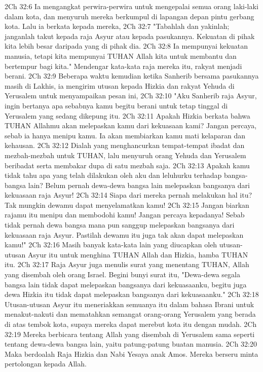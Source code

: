 2Ch 32:6  Ia mengangkat perwira-perwira untuk mengepalai semua orang laki-laki dalam kota, dan menyuruh mereka berkumpul di lapangan depan pintu gerbang kota. Lalu ia berkata kepada mereka,
2Ch 32:7  "Tabahlah dan yakinlah; janganlah takut kepada raja Asyur atau kepada pasukannya. Kekuatan di pihak kita lebih besar daripada yang di pihak dia.
2Ch 32:8  Ia mempunyai kekuatan manusia, tetapi kita mempunyai TUHAN Allah kita untuk membantu dan bertempur bagi kita." Mendengar kata-kata raja mereka itu, rakyat menjadi berani.
2Ch 32:9  Beberapa waktu kemudian ketika Sanherib bersama pasukannya masih di Lakhis, ia mengirim utusan kepada Hizkia dan rakyat Yehuda di Yerusalem untuk menyampaikan pesan ini,
2Ch 32:10  "Aku Sanherib raja Asyur, ingin bertanya apa sebabnya kamu begitu berani untuk tetap tinggal di Yerusalem yang sedang dikepung itu.
2Ch 32:11  Apakah Hizkia berkata bahwa TUHAN Allahmu akan melepaskan kamu dari kekuasaan kami? Jangan percaya, sebab ia hanya menipu kamu. Ia akan membiarkan kamu mati kelaparan dan kehausan.
2Ch 32:12  Dialah yang menghancurkan tempat-tempat ibadat dan mezbah-mezbah untuk TUHAN, lalu menyuruh orang Yehuda dan Yerusalem beribadat serta membakar dupa di satu mezbah saja.
2Ch 32:13  Apakah kamu tidak tahu apa yang telah dilakukan oleh aku dan leluhurku terhadap bangsa-bangsa lain? Belum pernah dewa-dewa bangsa lain melepaskan bangsanya dari kekuasaan raja Asyur!
2Ch 32:14  Siapa dari mereka pernah melakukan hal itu? Tak mungkin dewamu dapat menyelamatkan kamu!
2Ch 32:15  Jangan biarkan rajamu itu menipu dan membodohi kamu! Jangan percaya kepadanya! Sebab tidak pernah dewa bangsa mana pun sanggup melepaskan bangsanya dari kekuasaan raja Asyur. Pastilah dewamu itu juga tak akan dapat melepaskan kamu!"
2Ch 32:16  Masih banyak kata-kata lain yang diucapkan oleh utusan-utusan Asyur itu untuk menghina TUHAN Allah dan Hizkia, hamba TUHAN itu.
2Ch 32:17  Raja Asyur juga menulis surat yang menentang TUHAN, Allah yang disembah oleh orang Israel. Begini bunyi surat itu, "Dewa-dewa segala bangsa lain tidak dapat melepaskan bangsanya dari kekuasaanku, begitu juga dewa Hizkia itu tidak dapat melepaskan bangsanya dari kekuasaanku."
2Ch 32:18  Utusan-utusan Asyur itu meneriakkan semuanya itu dalam bahasa Ibrani untuk menakut-nakuti dan mematahkan semangat orang-orang Yerusalem yang berada di atas tembok kota, supaya mereka dapat merebut kota itu dengan mudah.
2Ch 32:19  Mereka berbicara tentang Allah yang disembah di Yerusalem sama seperti tentang dewa-dewa bangsa lain, yaitu patung-patung buatan manusia.
2Ch 32:20  Maka berdoalah Raja Hizkia dan Nabi Yesaya anak Amos. Mereka berseru minta pertolongan kepada Allah.
